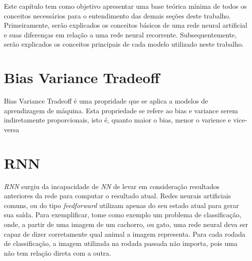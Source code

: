 Este capítulo tem como objetivo apresentar uma base teórica mínima de todos os conceitos necessários para o entendimento das demais seções deste trabalho. Primeiramente, serão explicados os conceitos básicos de uma rede neural artificial e suas diferenças em relação a uma rede neural recorrente. Subsequentemente, serão explicados os conceitos principais de cada modelo utilizado neste trabalho.


\section{Bias Variance Tradeoff}


Bias Variance Tradeoff é uma propridade que se aplica a modelos de aprendizagem de máquina. Esta propriedade se refere ao bias e variance serem indiretamente proporcionais, isto é, quanto maior o bias, menor o varience e vice-versa

\section{\acrfull{RNN}}




\textit{\acrshort{RNN}} surgiu da incapacidade de \textit{\acrfull{NN}} de levar em consideração resultados anteriores da rede para computar o resultado atual. Redes neurais artificiais comuns, ou do tipo \textit{feedforward} utilizam apenas do seu estado atual para gerar sua saída. Para exemplificar, tome como exemplo um problema de classificação, onde, a partir de uma imagem de um cachorro, ou gato, uma rede neural deva ser capaz de dizer corretamente qual animal a imagem representa. Para cada rodada de classificação, a imagem utilizada na rodada passada não importa, pois uma não tem relação direta com a outra. 

